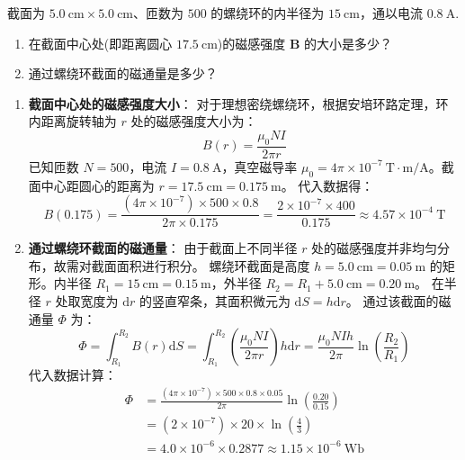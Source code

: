 \begin{exercise}\label{ex:17.6}
截面为 $5.0 \ \mathrm{cm} \times 5.0 \ \mathrm{cm}$、匝数为 $500$ 的螺绕环的内半径为 $15 \ \mathrm{cm}$，通以电流 $0.8 \ \mathrm{A}$. 
\begin{enumerate}
  \item[(a)] 在截面中心处(即距离圆心 $17.5 \ \mathrm{cm}$)的磁感强度 $\boldsymbol{B}$ 的大小是多少？
  \item[(b)] 通过螺绕环截面的磁通量是多少？
\end{enumerate}
\end{exercise}
\begin{solution}
\begin{enumerate}
    \item[(a)] \textbf{截面中心处的磁感强度大小}：
    对于理想密绕螺绕环，根据安培环路定理，环内距离旋转轴为 $r$ 处的磁感强度大小为：
    $$ B(r) = \frac{\mu_0 N I}{2\pi r} $$
    已知匝数 $N = 500$，电流 $I = 0.8 \ \mathrm{A}$，真空磁导率 $\mu_0 = 4\pi \times 10^{-7} \ \mathrm{T \cdot m/A}$。截面中心距圆心的距离为 $r = 17.5 \ \mathrm{cm} = 0.175 \ \mathrm{m}$。
    代入数据得：
    $$ B(0.175) = \frac{(4\pi \times 10^{-7}) \times 500 \times 0.8}{2\pi \times 0.175} = \frac{2 \times 10^{-7} \times 400}{0.175} \approx 4.57 \times 10^{-4} \ \mathrm{T} $$

    \item[(b)] \textbf{通过螺绕环截面的磁通量}：
    由于截面上不同半径 $r$ 处的磁感强度并非均匀分布，故需对截面面积进行积分。
    螺绕环截面是高度 $h = 5.0 \ \mathrm{cm} = 0.05 \ \mathrm{m}$ 的矩形。内半径 $R_1 = 15 \ \mathrm{cm} = 0.15 \ \mathrm{m}$，外半径 $R_2 = R_1 + 5.0 \ \mathrm{cm} = 0.20 \ \mathrm{m}$。
    在半径 $r$ 处取宽度为 $\mathrm{d}r$ 的竖直窄条，其面积微元为 $\mathrm{d}S = h \mathrm{d}r$。
    通过该截面的磁通量 $\Phi$ 为：
    $$ \Phi = \int_{R_1}^{R_2} B(r) \mathrm{d}S = \int_{R_1}^{R_2} \left( \frac{\mu_0 N I}{2\pi r} \right) h \mathrm{d}r = \frac{\mu_0 N I h}{2\pi} \ln\left( \frac{R_2}{R_1} \right) $$
    代入数据计算：
    \begin{align*}
        \Phi &= \frac{(4\pi \times 10^{-7}) \times 500 \times 0.8 \times 0.05}{2\pi} \ln\left(\frac{0.20}{0.15}\right) \\
             &= (2 \times 10^{-7}) \times 20 \times \ln\left(\frac{4}{3}\right) \\
             &= 4.0 \times 10^{-6} \times 0.2877 \approx 1.15 \times 10^{-6} \ \mathrm{Wb}
    \end{align*}
\end{enumerate}
\end{solution}

